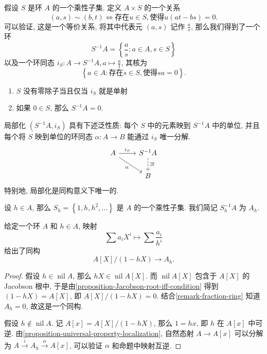 假设 \( S \) 是环 \( A \) 的一个乘性子集. 定义 \( A \times S \) 的一个关系
\[
  (a, s) \sim (b, t) \iff \text{存在} u \in S, \text{使得} u(at - bs) = 0.
\]
可以验证, 这是一个等价关系, 将其中代表元 \( (a, s) \) 记作 \(
\frac{a}{s} \), 那么我们得到了一个环
\[
  S^{-1}A = \left\lbrace \frac{a}{s}: a \in A, s \in S \right\rbrace
\]
以及一个环同态 \( i_S: A \to S^{-1} A, a \mapsto \frac{a}{1} \), 其核为
\[
  \left\lbrace a \in A: \text{存在} s \in S, \text{使得} sa = 0 \right\rbrace.
\]
\begin{remark}
  \label{remark-fraction-ring}
  \begin{enumerate}
    \item \( S \) 没有零除子当且仅当 \( i_S \) 就是单射
    \item 如果 \( 0 \in S \), 那么 \( S^{-1} A = 0 \).
  \end{enumerate}
\end{remark}
\begin{proposition}
  \label{proposition-universal-property-localization}
  局部化 \( (S^{-1}A, i_S) \) 具有下述泛性质: 每个 \( S \) 中的元素映到 \(
  S^{-1} A \) 中的单位, 并且每个将 \( S \) 映到单位的环同态 \( \alpha: A \to B
  \) 能通过 \( i_S \) 唯一分解.
\[\begin{tikzcd}
	A & {S^{-1}A} \\
	& B
	\arrow["{i_S}", from=1-1, to=1-2]
	\arrow["\alpha"', from=1-1, to=2-2]
	\arrow["{\exists !}", dashed, from=1-2, to=2-2]
\end{tikzcd}\]
特别地, 局部化是同构意义下唯一的.
\end{proposition}

设 \( h \in A \), 那么 \( S_h = \left\lbrace 1, h, h^2, \ldots \right\rbrace \)
是 \( A \) 的一个乘性子集. 我们简记 \( S_h^{-1}A \) 为 \( A_h \).

\begin{proposition}
  给定一个环 \( A \) 和 \( h \in A \), 映射
  \[
    \sum a_i X^i \mapsto \sum \frac{a_i}{h^i}
  \]
  给出了同构
  \[
    A[X] / (1 - hX) \to A_h.
  \]
\end{proposition}
\begin{proof}
  假设 \( h \in \operatorname{nil} A \), 那么 \( hX \in \operatorname{nil} A[X]
  \).
  而 \( \operatorname{nil}A[X] \) 包含于 \( A[X] \) 的 Jacobson 根中,
  于是由\cref{proposition-Jacobson-root-iff-condition} 得到 \( (1 - hX) = A[X]
  \), 即 \( A[X] / (1 - hX) = 0 \).
  结合\cref{remark-fraction-ring} 知道 \( A_h = 0 \), 故这是一个同构.

  假设 \( h \notin \operatorname{nil} A \).
  记 \( A[x] = A[X] / (1 - hX)\), 那么 \( 1 = hx \), 即 \( h \) 在 \( A[x] \)
  中可逆.
  由\cref{proposition-universal-property-localization}, 自然态射 \( A \to A[x]
  \) 可以分解为 \( A \xrightarrow{i} A_h \xrightarrow{\alpha} A[x]  \), 可以验证
  \( \alpha \) 和命题中映射互逆.
\end{proof}

